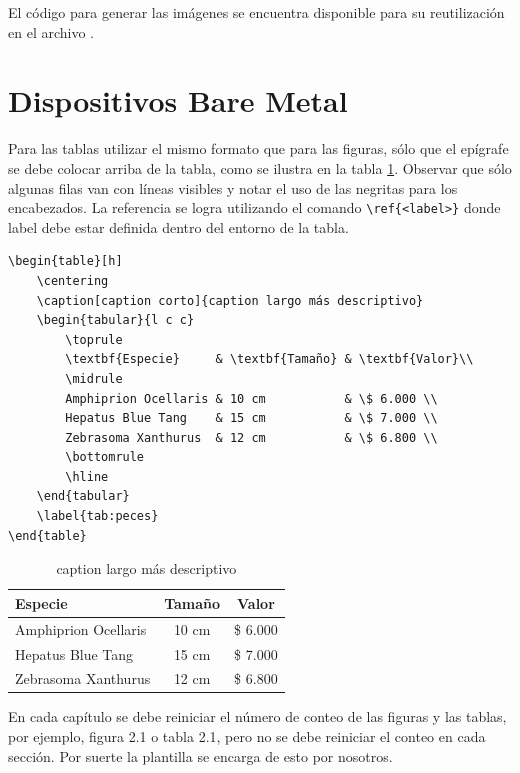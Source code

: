 El código para generar las imágenes se encuentra disponible para su reutilización en el archivo .

\section{Dispositivos Bare Metal}

Para las tablas utilizar el mismo formato que para las figuras, sólo que el epígrafe se debe colocar arriba de la tabla, como se ilustra en la tabla \ref{tab:peces}. Observar que sólo algunas filas van con líneas visibles y notar el uso de las negritas para los encabezados.  La referencia se logra utilizando el comando \verb|\ref{<label>}| donde label debe estar definida dentro del entorno de la tabla.

\begin{verbatim}
\begin{table}[h]
	\centering
	\caption[caption corto]{caption largo más descriptivo}
	\begin{tabular}{l c c}    
		\toprule
		\textbf{Especie}     & \textbf{Tamaño} & \textbf{Valor}\\
		\midrule
		Amphiprion Ocellaris & 10 cm           & \$ 6.000 \\		
		Hepatus Blue Tang    & 15 cm           & \$ 7.000 \\
		Zebrasoma Xanthurus  & 12 cm           & \$ 6.800 \\
		\bottomrule
		\hline
	\end{tabular}
	\label{tab:peces}
\end{table}
\end{verbatim}


\begin{table}[h]
	\centering
	\caption[caption corto]{caption largo más descriptivo}
	\begin{tabular}{l c c}    
		\toprule
		\textbf{Especie} 	 & \textbf{Tamaño} 		& \textbf{Valor}  \\
		\midrule
		Amphiprion Ocellaris & 10 cm 				& \$ 6.000 \\		
		Hepatus Blue Tang	 & 15 cm				& \$ 7.000 \\
		Zebrasoma Xanthurus	 & 12 cm				& \$ 6.800 \\
		\bottomrule
		\hline
	\end{tabular}
	\label{tab:peces}
\end{table}

En cada capítulo se debe reiniciar el número de conteo de las figuras y las tablas, por ejemplo, figura 2.1 o tabla 2.1, pero no se debe reiniciar el conteo en cada sección. Por suerte la plantilla se encarga de esto por nosotros.

